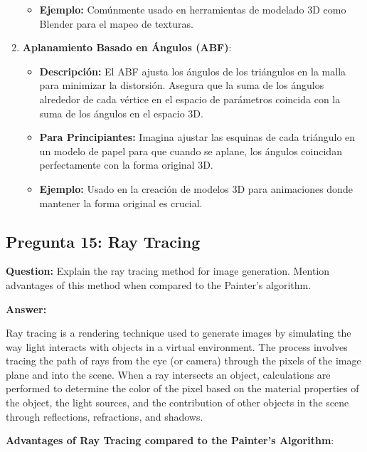 \documentclass{article}
\begin{document}
\begin{enumerate}
\begin{itemize}
        \item \textbf{Ejemplo:} Comúnmente usado en herramientas de modelado 3D como Blender para el mapeo de texturas.
    \end{itemize}
    \item \textbf{Aplanamiento Basado en Ángulos (ABF)}:
    \begin{itemize}
        \item \textbf{Descripción:} El ABF ajusta los ángulos de los triángulos en la malla para minimizar la distorsión. Asegura que la suma de los ángulos alrededor de cada vértice en el espacio de parámetros coincida con la suma de los ángulos en el espacio 3D.
        \item \textbf{Para Principiantes:} Imagina ajustar las esquinas de cada triángulo en un modelo de papel para que cuando se aplane, los ángulos coincidan perfectamente con la forma original 3D.
        \item \textbf{Ejemplo:} Usado en la creación de modelos 3D para animaciones donde mantener la forma original es crucial.
    \end{itemize}
\end{enumerate}

\subsection{Pregunta 15: Ray Tracing}

\textbf{Question:} Explain the ray tracing method for image generation. Mention advantages of this method when compared to the Painter’s algorithm.

\textbf{Answer:}

Ray tracing is a rendering technique used to generate images by simulating the way light interacts with objects in a virtual environment. The process involves tracing the path of rays from the eye (or camera) through the pixels of the image plane and into the scene. When a ray intersects an object, calculations are performed to determine the color of the pixel based on the material properties of the object, the light sources, and the contribution of other objects in the scene through reflections, refractions, and shadows.

\textbf{Advantages of Ray Tracing compared to the Painter’s Algorithm}:
\end{document}
